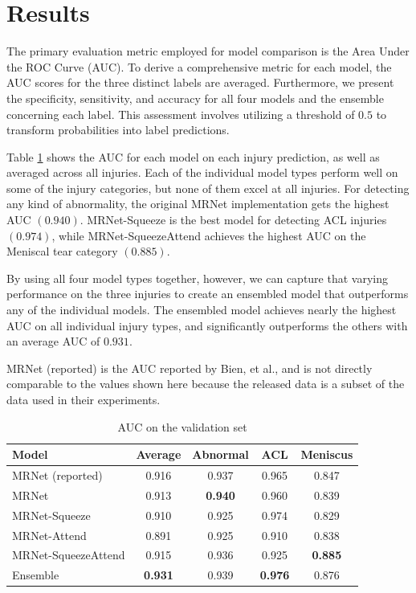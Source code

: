 \documentclass[conference]{IEEEtran}
\begin{document}
\section{Results}
The primary evaluation metric employed for model comparison is the Area Under the ROC Curve (AUC). To derive a comprehensive metric for each model, the AUC scores for the three distinct labels are averaged. Furthermore, we present the specificity, sensitivity, and accuracy for all four models and the ensemble concerning each label. This assessment involves utilizing a threshold of $0.5$ to transform probabilities into label predictions.

Table \ref{tab:results} shows the AUC for each model on each injury prediction, as well as averaged across all injuries. Each of the individual model types perform well on some of the injury categories, but none of them excel at all injuries. For detecting any kind of abnormality, the original MRNet implementation gets the highest AUC $(0.940)$. MRNet-Squeeze is the best model for detecting ACL injuries $(0.974)$, while MRNet-SqueezeAttend achieves the highest AUC on the Meniscal tear category $(0.885)$.

By using all four model types together, however, we can capture that varying performance on the three injuries to create an ensembled model that outperforms any of the individual models. The ensembled model achieves nearly the highest AUC on all individual injury types, and significantly outperforms the others with an average AUC of $0.931$.

MRNet (reported) is the AUC reported by Bien, et al.\cite{bien2018deep}, and is not directly comparable to the values shown here because the released data is a subset of the data used in their experiments.

\begin{table}[h!]
\begin{center}
\begin{tabular}{|l|c|c|c|c|}
\hline
Model & Average & Abnormal & ACL & Meniscus \\
\hline
MRNet (reported) & 0.916 & 0.937 & 0.965 & 0.847 \\
\hline
MRNet & 0.913 & \textbf{0.940} & 0.960 & 0.839 \\
MRNet-Squeeze & 0.910 & 0.925 & 0.974 & 0.829 \\
MRNet-Attend & 0.891 & 0.925 & 0.910 & 0.838 \\
MRNet-SqueezeAttend & 0.915 & 0.936 & 0.925 & \textbf{0.885}\\
\hline
Ensemble & \textbf{0.931} & 0.939 & \textbf{0.976} & 0.876 \\
\hline
\end{tabular}
\end{center}
\caption{AUC on the validation set}
\label{tab:results}
\end{table}
\end{document}
